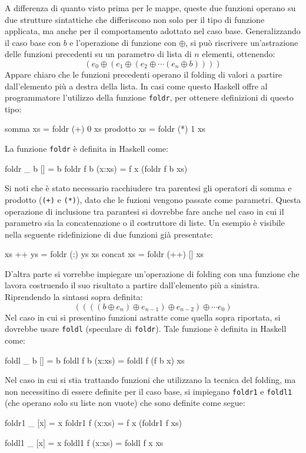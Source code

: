 A differenza di quanto visto prima per le mappe, queste due funzioni operano su due 
strutture sintattiche che differiscono non solo per il tipo di funzione 
applicata, ma anche per il comportamento adottato nel caso base.
Generalizzando il caso base con $b$ e l'operazione di funzione con 
$\oplus$, si pu\`o riscrivere un'astrazione delle funzioni precedenti su 
un parametro di lista di $n$ elementi, ottenendo: $$(e_{0} \oplus (e_{1} 
\oplus (e_{2} \oplus \cdots (e_{n} \oplus b) )))$$
Appare chiaro che le funzioni precedenti operano il folding di valori a 
partire dall'elemento pi\`u a destra della lista. In casi come questo 
Haskell offre al programmatore l'utilizzo della funzione \verb"foldr", per 
ottenere definizioni di questo tipo:
\begin{haskellCode}
somma xs    = foldr (+) 0 xs
prodotto xs = foldr (*) 1 xs
\end{haskellCode}
%
La funzione \verb"foldr" \`e definita in Haskell come:
\begin{haskellCode}
foldr _ b []     = b
foldr f b (x:xs) = f x (foldr f b xs)
\end{haskellCode}
%
Si noti che \`e stato necessario racchiudere tra parentesi gli operatori 
di somma e prodotto (\verb"(+)" e \verb"(*)"), dato che le fuzioni vengono passate 
come parametri. Questa operazione di inclusione tra parantesi si dovrebbe fare anche nel caso in cui il parametro sia la 
concatenazione o il costruttore di liste. Un 
esempio \`e visibile nella seguente ridefinizione di due funzioni gi\`a presentate:
\begin{haskellCode}
xs ++ ys  = foldr (:) ys xs
concat xs = foldr (++) [] xs
\end{haskellCode}
%
D'altra parte si vorrebbe impiegare un'operazione di folding con una 
funzione che lavora costruendo il suo risultato a partire dall'elemento 
pi\`u a sinistra. Riprendendo la sintassi sopra definita:
$$((((b \oplus e_{n}) \oplus e_{n-1}) \oplus e_{n-2}) \oplus \cdots 
e_{0})$$
Nel caso in cui si presentino funzioni astratte come quella sopra riportata, si dovrebbe usare 
\verb"foldl" (speculare di \verb"foldr"). Tale funzione \`e definita in Haskell come:
\begin{haskellCode}
foldl _ b []     = b
foldl f b (x:xs) = foldl f (f b x) xs
\end{haskellCode}
%
Nel caso in cui si stia trattando funzioni che utilizzano la tecnica del 
folding, ma non necessitino di essere definite per il caso base, si 
impiegano \verb"foldr1" e \verb"foldl1" (che operano solo su liste non 
vuote) che sono definite come segue:
\begin{haskellCode}
foldr1 _ [x]    = x
foldr1 f (x:xs) = f x (foldr1 f xs)
\end{haskellCode}
\begin{haskellCode}
foldl1 _ [x]    = x
foldl1 f (x:xs) = foldl f x xs
\end{haskellCode}

